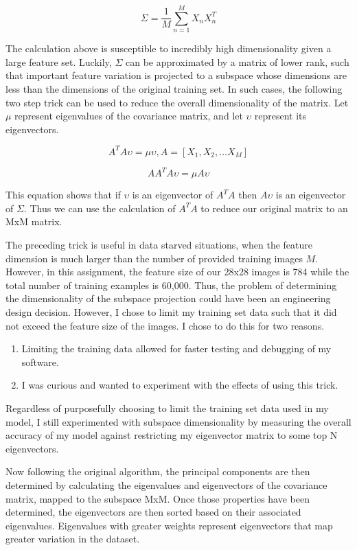 \documentclass[12pt]{article}
\begin{document}
\[\Sigma = \frac{1}{M}\sum_{n=1}^{M}X_{n}X_{n}^{T}\]

\noindent
The calculation above is susceptible to incredibly high dimensionality given a large feature set. Luckily, \(\Sigma \) can be approximated by a matrix of lower rank, such that important feature variation is projected to a subspace whose dimensions are less than the dimensions of the original training set. In such cases, the following two step trick can be used to reduce the overall dimensionality of the matrix. Let \(\mu\) represent eigenvalues of the covariance matrix, and let \(\upsilon\) represent its eigenvectors. 

\[A^{T}A\upsilon = \mu\upsilon, A = [X_{1},X_{2},...X_{M}] \]

\[A A^{T}A\upsilon = \mu A \upsilon \]

\noindent
This equation shows that if \(\upsilon\) is an eigenvector of \(A^{T} A\) then \(A \upsilon\) is an eigenvector of \(\Sigma\). Thus we can use the calculation of \(A^{T} A\) to reduce our original matrix to an MxM matrix.

\bigbreak
\noindent
The preceding trick is useful in data starved situations, when the feature dimension is much larger than the number of provided training images \(M\). However, in this assignment, the feature size of our 28x28 images is 784 while the total number of training examples is 60,000. Thus, the problem of determining the dimensionality of the subspace projection could have been an engineering design decision. However, I chose to limit my training set data such that it did not exceed the feature size of the images. I chose to do this for two reasons. 

\begin{enumerate}
    \item Limiting the training data allowed for faster testing and debugging of my software.
    \item I was curious and wanted to experiment with the effects of using this trick.
\end{enumerate}

\noindent 
Regardless of purposefully choosing to limit the training set data used in my model, I still experimented with subspace dimensionality by measuring the overall accuracy of my model against restricting my eigenvector matrix to some top N  eigenvectors.

\bigbreak
\noindent
Now following the original algorithm, the principal components are then determined by calculating the eigenvalues and eigenvectors of the covariance matrix, mapped to the subspace MxM. Once those properties have been determined, the eigenvectors are then sorted based on their associated eigenvalues. Eigenvalues with greater weights represent eigenvectors that map greater variation in the dataset. 
\end{document}

